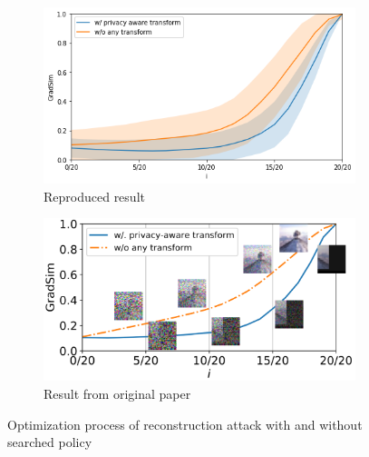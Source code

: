 \begin{figure}[h]
        \centering
        \begin{subfigure}{0.4\textwidth}
             \includegraphics[width=1.\textwidth]{images/fig1.png}
             \caption{Reproduced result}
            \label{fig:1re}
        \end{subfigure}
        \begin{subfigure}{0.4\textwidth}
             \includegraphics[width=1.\textwidth]{images/fig1OG.png}
             \caption{Result from original paper}
            \label{fig:1og}
        \end{subfigure}\hfill
        \caption{Optimization process of reconstruction attack with and without searched policy}
        \label{fig:1}
\end{figure}

